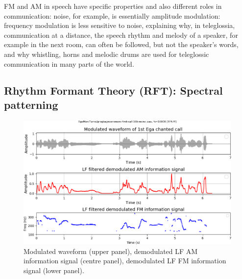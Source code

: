 \documentclass[output=paper,colorlinks,citecolor=brown]{langscibook}
\begin{document}
FM and AM in speech have specific properties and also different roles in communication: noise, for example, is essentially amplitude modulation: frequency modulation is less sensitive to noise, explaining why, in teleglossia, communication at a distance, the speech rhythm and melody of a speaker, for example in the next room, can often be followed, but not the speaker's words, and why whistling, horns and melodic drums are used for teleglossic communication in many parts of the world.

\subsection{Rhythm Formant Theory (RFT): Spectral patterning}

\begin{figure}
\includegraphics[trim={1.5cm 1.5cm 0 0}, clip, width=\textwidth]{gibbon_figure05.png}
\caption{\label{fig:fig05}Modulated waveform (upper panel), demodulated LF AM information signal (centre panel), demodulated LF FM information signal (lower panel).}
\end{figure}
\end{document}
